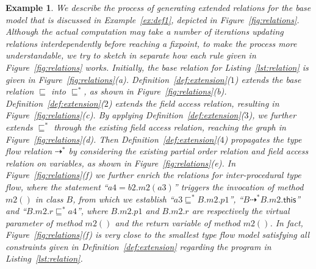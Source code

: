 \documentclass{fac}
\newtheorem{Example}{Example}
\newcommand{\keyword}[1]{\mathsf{#1}}
\newcommand{\less}{\sqsubseteq}
\newcommand{\tflow}{\dashrightarrow}
\begin{document}
\begin{Example}\label{ex:def2} %
We describe the process of generating extended relations for the base model that is discussed in Example~\ref{ex:def1}, depicted in Figure~\ref{fig:relations}. Although the actual computation may take a number of iterations updating relations interdependently before reaching a fixpoint, to make the process more understandable, we try to sketch in separate how each rule given in Figure~\ref{fig:relations} works. Initially, the base relation for Listing~\ref{lst:relation} is given in Figure~\ref{fig:relations}(a). Definition~\ref{def:extension}($1$) extends the base relation $\less$ into $\less^*$, as shown in Figure~\ref{fig:relations}(b). Definition~\ref{def:extension}($2$) extends the field access relation, resulting in Figure~\ref{fig:relations}(c). By applying Definition~\ref{def:extension}($3$), we further extends $\less^*$ through the existing field access relation, reaching the graph in Figure~\ref{fig:relations}(d). Then Definition~\ref{def:extension}($4$) propagates the type flow relation $\tflow^*$ by considering the existing partial order relation and field access relation on variables, as shown in Figure~\ref{fig:relations}(e). In Figure~\ref{fig:relations}(f) we further enrich the relations for inter-procedural type flow, where the statement ``$a4=b2.m2(a3)$'' triggers the invocation of method $m2()$ in class $B$, from which we establish ``$a3 \less^* B.m2.p1$'', ``$B \tflow^* B.m2.\keyword{this}$'' and ``$B.m2.r \less^* a4$'', where $B.m2.p1$ and $B.m2.r$ are respectively the virtual parameter of method $m2()$ and the return variable of method $m2()$. In fact, Figure~\ref{fig:relations}(f) is very close to the smallest type flow model satisfying all constraints given in Definition~\ref{def:extension} regarding the program in Listing~\ref{lst:relation}.
%
\end{Example}
\end{document}
